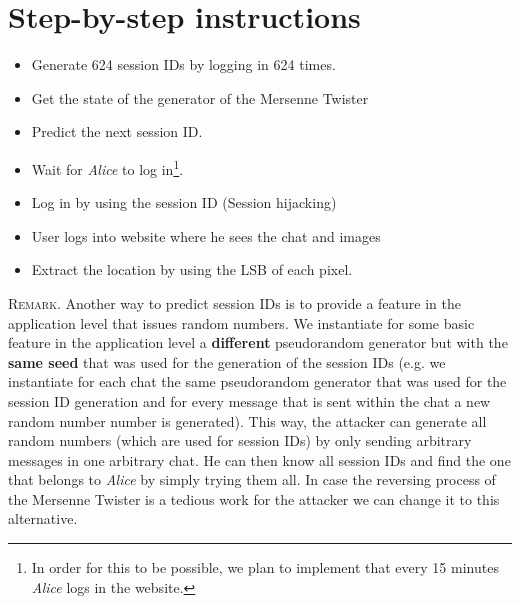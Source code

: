 \documentclass[11pt]{article}
\begin{document}
\section{Step-by-step instructions}
\begin{itemize}
\item Generate 624 session IDs by logging in 624 times.
\item Get the state of the generator of the Mersenne Twister
\item Predict the next session ID.
\item Wait for \textit{Alice} to log in\footnote{In order for this to be possible, we plan to implement that every 15 minutes \textit{Alice} logs in the website.}.
\item Log in by using the session ID (Session hijacking)
\item User logs into website where he sees the chat and images
\item Extract the location by using the LSB of each pixel.
\end{itemize}


\textsc{Remark.\quad} Another way to predict session IDs is to provide a feature in the application level that issues random numbers. We instantiate for some basic feature in the application level a \textbf{different} pseudorandom generator but with the \textbf{same seed} that was used for the generation of the session IDs (e.g. we instantiate for each chat the same pseudorandom generator that was used for the session ID generation and for every message that is sent within the chat a new random number number is generated). This way, the attacker can generate all random numbers (which are used for session IDs) by only sending arbitrary messages in one arbitrary chat. He can then know all session IDs and find the one that belongs to \textit{Alice} by simply trying them all. In case the reversing process of the Mersenne Twister is a tedious work for the attacker we can change it to this alternative.

\begin{spacing}{1}
  
  
\end{spacing}
\end{document}
